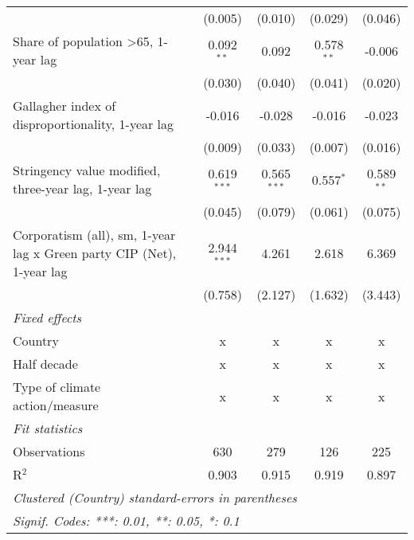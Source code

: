 \begin{table}[htbp]
\begin{tabular}{lcccc}
                                                                            & (0.005)        & (0.010)         & (0.029)         & (0.046)\\   
      Share of population >65, 1-year lag                                   & 0.092$^{**}$   & 0.092           & 0.578$^{**}$    & -0.006\\   
                                                                            & (0.030)        & (0.040)         & (0.041)         & (0.020)\\   
      Gallagher index of disproportionality, 1-year lag                     & -0.016         & -0.028          & -0.016          & -0.023\\   
                                                                            & (0.009)        & (0.033)         & (0.007)         & (0.016)\\   
      Stringency value modified, three-year lag, 1-year lag                 & 0.619$^{***}$  & 0.565$^{***}$   & 0.557$^{*}$     & 0.589$^{**}$\\   
                                                                            & (0.045)        & (0.079)         & (0.061)         & (0.075)\\   
      Corporatism (all), sm, 1-year lag x Green party CIP (Net), 1-year lag & 2.944$^{***}$  & 4.261           & 2.618           & 6.369\\   
                                                                            & (0.758)        & (2.127)         & (1.632)         & (3.443)\\   
      \emph{Fixed effects}\\
      Country                                                               & x              & x               & x               & x\\  
      Half decade                                                           & x              & x               & x               & x\\  
      Type of climate action/measure                                        & x              & x               & x               & x\\  
      \midrule \emph{Fit statistics}\\
      Observations                                                          & 630            & 279             & 126             & 225\\  
      R$^2$                                                                 & 0.903          & 0.915           & 0.919           & 0.897\\  
      \midrule
      \multicolumn{5}{l}{\emph{Clustered (Country) standard-errors in parentheses}}\\
      \multicolumn{5}{l}{\emph{Signif. Codes: ***: 0.01, **: 0.05, *: 0.1}}\\
   \end{tabular}
\end{table}


